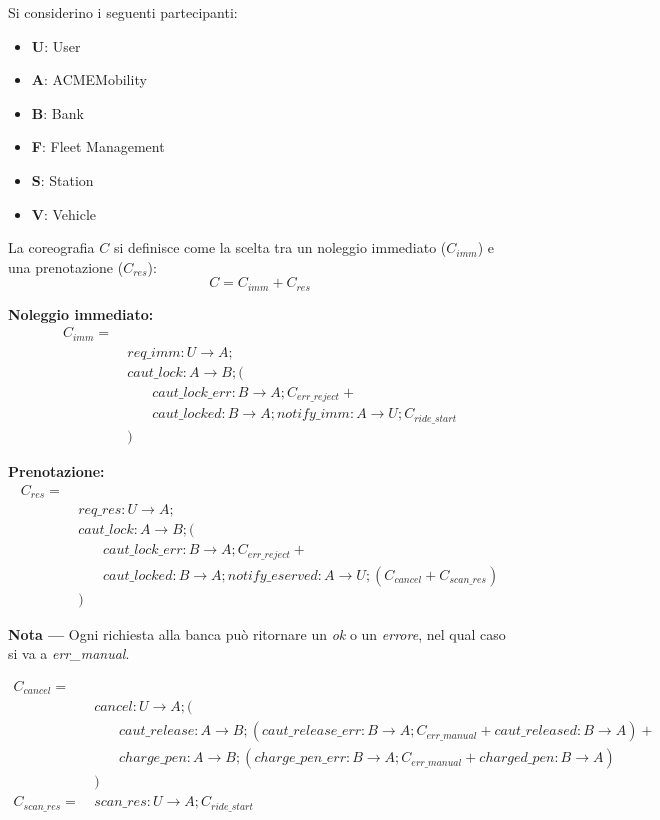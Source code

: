Si considerino i seguenti partecipanti:
\begin{itemize}
    \item \textbf{U}: User
    \item \textbf{A}: ACMEMobility
    \item \textbf{B}: Bank
    \item \textbf{F}: Fleet Management
    \item \textbf{S}: Station
    \item \textbf{V}: Vehicle
\end{itemize}

La coreografia $C$ si definisce come la scelta tra un noleggio immediato
($C_{imm}$) e una prenotazione ($C_{res}$):
\[ C = C_{imm} + C_{res} \]

\textbf{Noleggio immediato:}\\
\begin{align*}
C_{imm} = \\
& \ req\_imm: U \rightarrow A ; \\
& \ caut\_lock: A \rightarrow B ; ( \\
& \quad \quad caut\_lock\_err: B \rightarrow A ; C_{err\_reject} + \\
& \quad \quad caut\_locked: B \rightarrow A ; notify\_imm: A \rightarrow U ; C_{ride\_start} \\
& \ )
\end{align*}

\textbf{Prenotazione:}\\
\begin{align*}
C_{res} = \\
& \ req\_res: U \rightarrow A ; \\
& \ caut\_lock: A \rightarrow B ; ( \\
& \quad \quad caut\_lock\_err: B \rightarrow A ; C_{err\_reject} + \\
& \quad \quad caut\_locked: B \rightarrow A ; notify\_eserved: A \rightarrow U ; ( C_{cancel} + C_{scan\_res} ) \\
& \ )
\end{align*}

\textbf{Nota ---} Ogni richiesta alla banca può ritornare un \textit{ok} o un
\textit{errore}, nel qual caso si va a \textit{err\_manual}.

\begin{align*}
C_{cancel} = \\
& \ cancel: U \rightarrow A ; ( \\
& \quad \quad caut\_release: A \rightarrow B ; (caut\_release\_err: B \rightarrow A ; C_{err\_manual} + caut\_released: B \rightarrow A) + \\
& \quad \quad charge\_pen: A \rightarrow B; (charge\_pen\_err: B \rightarrow A ; C_{err\_manual} + charged\_pen: B \rightarrow A) \\
& \ ) \\
C_{scan\_res} = & \ scan\_res: U \rightarrow A ; C_{ride\_start}
\end{align*}

